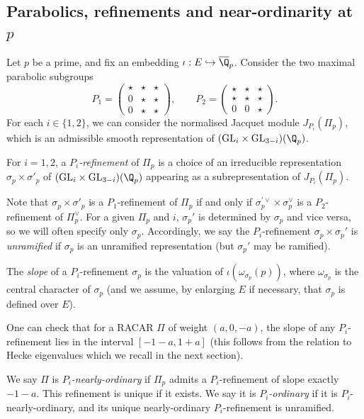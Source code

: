 \documentclass[10pt,reqno,a4paper]{amsart}
\newcommand{\GL}{\mathrm{GL}}
\newcommand{\smallthreemat}[9]{\left(\begin{smallmatrix}
#1 & #2 & #3 \\
#4 & #5 & #6 \\
#7 & #8 & #9\end{smallmatrix}\right)}
\begin{document}
\subsection{Parabolics, refinements and near-ordinarity at \texorpdfstring{$p$}{p}}
 \label{sec:ordinarity}

 Let $p$ be a prime, and fix an embedding $\iota: E \hookrightarrow \overline{\Q}_p$. Consider the two maximal parabolic subgroups
 \[
  P_1 = \smallthreemat{\star}{\star}{\star}{0}{\star}{\star}{0}{\star}{\star}, \qquad
  P_2 = \smallthreemat{\star}{\star}{\star}{\star}{\star}{\star}{0}{0}{\star}.
 \]
 For each $i \in \{1, 2\}$, we can consider the normalised Jacquet module $J_{P_i}(\Pi_p)$, which is an admissible smooth representation of $(\GL_i \times \GL_{3-i})(\Q_p)$.

 \begin{definition}
  For $i = 1, 2$, a \emph{$P_i$-refinement} of $\Pi_p$ is a choice of an irreducible representation $\sigma_p \times \sigma'_p$ of $(\GL_i \times \GL_{3-i})(\Q_p)$ appearing as a subrepresentation of $J_{P_i}(\Pi_p)$. 
 \end{definition}
 
 Note that $\sigma_p\times \sigma'_p$ is a $P_1$-refinement of $\Pi_p$ if and only if $\sigma_p^{\prime \vee} \times \sigma_p^\vee$ is a $P_2$-refinement of $\Pi_p^\vee$. For a given $\Pi_p$ and $i$, $\sigma_p'$ is determined by $\sigma_p$ and vice versa, so we will often specify only $\sigma_p$. Accordingly, we say the $P_i$-refinement $\sigma_p \times \sigma_p'$ is \emph{unramified} if $\sigma_p$ is an unramified representation (but $\sigma_p'$ may be ramified). 
 
 \begin{definition}
  The \emph{slope} of a $P_i$-refinement $\sigma_p$ is the valuation of $\iota(\omega_{\sigma_p}(p))$, where $\omega_{\sigma_p}$ is the central character of $\sigma_p$ (and we assume, by enlarging $E$ if necessary, that $\sigma_p$ is defined over $E$).
 \end{definition}

 One can check that for a RACAR $\Pi$ of weight $(a, 0, -a)$, the slope of any $P_i$-refinement lies in the interval $[-1-a, 1 + a]$ (this follows from the relation to Hecke eigenvalues which we recall in the next section).

 \begin{definition}
  We say $\Pi$ is \emph{$P_i$-nearly-ordinary} if $\Pi_p$ admits a $P_i$-refinement of slope exactly $-1-a$. This refinement is unique if it exists. We say it is \emph{$P_i$-ordinary} if it is $P_i$-nearly-ordinary, and its unique nearly-ordinary $P_i$-refinement is unramified.
 \end{definition}
\end{document}
